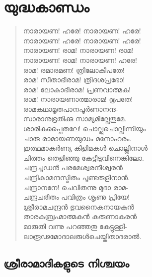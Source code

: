 
\chapter{യുദ്ധകാണ്ഡം}

\begin{verse}
നാരായണ! ഹരേ! നാരായണ! ഹരേ!\\
നാരായണ! ഹരേ! നാരായണ! ഹരേ!\\
നാരായണ! രാമ! നാരായണ! രാമ!\\
നാരായണ! രാമ! നാരായണ! ഹരേ!\\
രാമ! രമാരമണ! ത്രിലോകീപതേ!\\
രാമ! സീതാഭിരാമ! ത്രിദശപ്രഭോ!\\
രാമ! ലോകാഭിരാമ! പ്രണവാത്മക!\\
രാമ! നാരായണാത്മാരാമ! ഭൂപതേ!\\
രാമകഥാമൃതപാനപൂര്‍ണാനന്ദ-\\
സാരാനുഭൂതിക്കു സാമ്യമില്ലേതുമേ.\\
ശാരികപ്പൈതലേ! ചൊല്ലുചൊല്ലിന്നിയും\\
ചാരു രാമായണയുദ്ധം മനോഹരം.\\
ഇത്ഥമാകര്‍ണ്യ കിളിമകള്‍ ചൊല്ലിനാള്‍\\
ചിത്തം തെളിഞ്ഞു കേട്ടീടുവിനെങ്കിലോ.\\
ചന്ദ്രചൂഡന്‍ പരമേശ്വരനീശ്വരന്‍\\
ചന്ദ്രികാമന്ദസ്മിതം പൂണ്ടരുളിനാന്‍.\\
ചന്ദ്രാനനേ! ചെവിതന്നു മുദാ രാമ-\\
ചന്ദ്രചരിതം പവിത്രം ശൃണു പ്രിയേ!\\
ശ്രീരാമചന്ദ്രന്‍ ഭുവനൈകനായകന്‍\\
താരകബ്രഹ്മാത്മകന്‍ കരുണാകരന്‍\\
മാരുതി വന്നു പറഞ്ഞതു കേട്ടുള്ളി-\\
ലാരൂഢമോദാലരുള്‍ചെയ്തിതാദരാല്‍.
\end{verse}


\section{ശ്രീരാമാദികളുടെ നിശ്ചയം}

